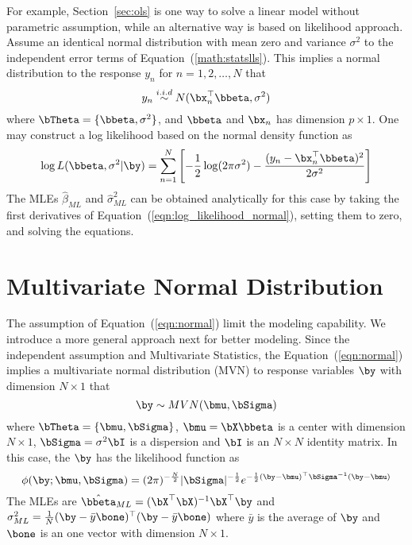 For example, Section~\ref{sec:ols} is one way to solve a linear model
without parametric assumption, while an alternative way is based on likelihood
approach.
Assume an identical normal distribution with mean zero and variance $\sigma^2$
to the independent error terms of Equation~(\ref{math:statslls}).
This implies a normal distribution
to the response $y_n$ for $n=1,2,\ldots, N$ that
\begin{equation}
y_n \stackrel{i.i.d}{\sim} N(\bx_n^\top\bbeta, \sigma^2)
\label{eqn:normal}
\end{equation}
where $\bTheta = \{\bbeta, \sigma^2\}$, and
$\bbeta$ and $\bx_n$ has dimension $p\times 1$.
One may construct a log likelihood based on the normal density function as
\begin{equation}
\log L(\bbeta, \sigma^2|\by) = \sum_{n = 1}^N
\left[
-\frac{1}{2} \log (2\pi \sigma^2) -
\frac{(y_n - \bx_n^\top\bbeta)^2}{2\sigma^2}
\right]
\label{eqn:log_likelihood_normal}
\end{equation}
The MLEs $\hat{\beta}_{ML}$ and
$\hat{\sigma}^2_{ML}$ can be obtained analytically for this case by
taking the first derivatives of Equation~(\ref{eqn:log_likelihood_normal}),
setting them to zero, and
solving the equations.




\section{Multivariate Normal Distribution}

The assumption of Equation~(\ref{eqn:normal}) limit the modeling capability.
We introduce a more general approach next for better
modeling. Since the independent assumption and Multivariate Statistics, the
Equation~(\ref{eqn:normal})
implies a multivariate normal distribution
(MVN)
to response variables $\by$ with dimension $N\times 1$ that
\begin{equation}
\by \sim MVN(\bmu, \bSigma)
\label{eqn:mvn_n}
\end{equation}
where $\bTheta = \{\bmu, \bSigma\}$, $\bmu = \bX\bbeta$ is a center with
dimension $N\times 1$, $\bSigma = \sigma^2\bI$ is a dispersion
and $\bI$ is an $N\times N$ identity matrix.
In this case, the $\by$ has the likelihood function as
\begin{equation*}
\displaystyle
\phi(\by; \bmu, \bSigma) =
(2\pi)^{-\frac{N}{2}} |\bSigma|^{-\frac{1}{2}}
e^{-\frac{1}{2} (\by - \bmu)^\top \bSigma^{-1} (\by - \bmu)}
\end{equation*}
The MLEs are
$\hat{\bbeta}_{ML} = (\bX^\top \bX)^{-1} \bX^\top \by$ and
$\sigma^2_{ML} = \frac{1}{N} (\by - \bar{y}\bone)^\top(\by - \bar{y}\bone)$
where $\bar{y}$ is the average of $\by$
and $\bone$ is an one vector with dimension $N\times 1$.

